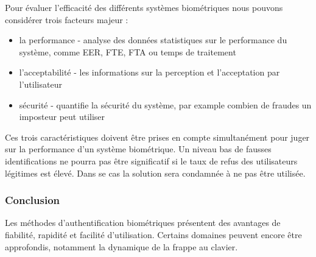 Pour évaluer l'efficacité des différents systèmes biométriques nous pouvons considérer trois facteurs majeur :\\

\begin{itemize}
\item la performance - analyse des données statistiques sur le performance du système, comme EER, FTE, FTA ou temps de traitement
\item l'acceptabilité - les informations sur la perception et l'acceptation par l'utilisateur 
\item sécurité - quantifie la sécurité du système, par example combien de fraudes un imposteur peut utiliser\\
\end{itemize}

Ces trois caractéristiques doivent être prises en compte simultanément pour juger sur la performance d'un système biométrique. Un niveau bas de fausses identifications ne pourra pas être significatif si le taux de refus des utilisateurs légitimes est élevé. Dans se cas la solution sera condamnée à ne pas être utilisée.

\subsubsection{Conclusion}

Les méthodes d'authentification biométriques présentent des avantages de fiabilité, rapidité et facilité d'utilisation. Certains domaines peuvent encore être approfondis, notamment la dynamique de la frappe au clavier.
